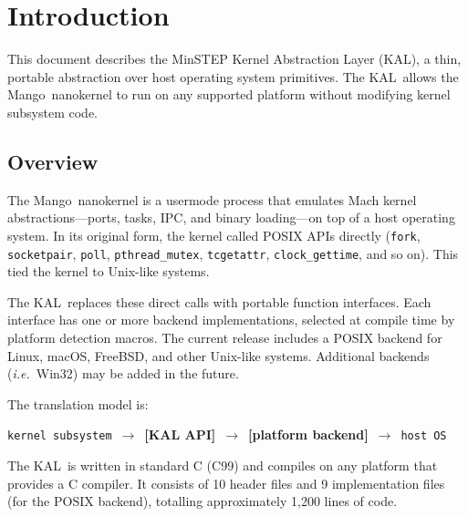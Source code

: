 \documentclass[11pt,twoside]{article}
\newcommand{\KAL}{KAL}
\newcommand{\Mango}{Mango}
\newcommand{\code}[1]{{\tt #1}}
\newcommand{\ie}{{\itshape i.e.}}
\begin{document}

\tableofcontents
\newpage

\section{Introduction}

This document describes the MinSTEP Kernel Abstraction Layer (\KAL),
a thin, portable abstraction over host operating system primitives.
The \KAL\ allows the \Mango\ nanokernel to run on any supported
platform without modifying kernel subsystem code.

\subsection{Overview}

The \Mango\ nanokernel is a usermode process that emulates Mach kernel
abstractions---ports, tasks, IPC, and binary loading---on top of a
host operating system.  In its original form, the kernel called
POSIX APIs directly (\code{fork}, \code{socketpair}, \code{poll},
\code{pthread\_mutex}, \code{tcgetattr}, \code{clock\_gettime}, and
so on).  This tied the kernel to Unix-like systems.

The \KAL\ replaces these direct calls with portable function
interfaces.  Each interface has one or more backend implementations,
selected at compile time by platform detection macros.  The current
release includes a POSIX backend for Linux, macOS, FreeBSD, and other
Unix-like systems.  Additional backends (\ie\ Win32) may be added
in the future.

The translation model is:

\begin{center}
{\tt kernel subsystem}~$\longrightarrow$~{\bfseries [KAL API]}~$\longrightarrow$~{\bfseries [platform backend]}~$\longrightarrow$~{\tt host OS}
\end{center}

The \KAL\ is written in standard C (C99) and compiles on any
platform that provides a C compiler.  It consists of 10 header files
and 9 implementation files (for the POSIX backend), totalling
approximately 1{,}200 lines of code.
\end{document}
